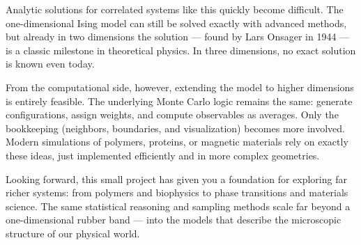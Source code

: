 \documentclass[11pt]{article}
\begin{document}
Analytic solutions for correlated systems like this quickly become difficult. The one-dimensional 
Ising model can still be solved exactly with advanced methods, but already in two dimensions the 
solution — found by Lars Onsager in 1944 — is a classic milestone in theoretical physics. In three 
dimensions, no exact solution is known even today.

From the computational side, however, extending the model to higher dimensions is entirely feasible.  The underlying Monte Carlo logic remains the same: generate configurations, assign weights, and compute observables as averages. Only the bookkeeping (neighbors, boundaries, and visualization) becomes more involved. Modern simulations of polymers, proteins, or magnetic materials rely on exactly these ideas, just implemented efficiently and in more complex geometries.

Looking forward, this small project has given you a foundation for exploring far richer systems: from polymers and biophysics to phase transitions and materials science. The same statistical reasoning and sampling methods scale far beyond a one-dimensional rubber band — into the models that describe the microscopic structure of our physical world.
\end{document}
